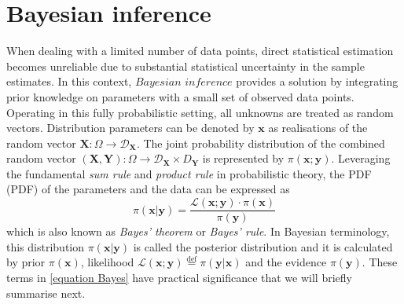 \label{ch:Bayesian}


\section{Bayesian inference}

When dealing with a limited number of data points, direct statistical estimation becomes unreliable due to substantial statistical uncertainty in the sample estimates. In this context, $\textit{Bayesian inference}$ provides a solution by integrating prior knowledge on parameters with a small set of observed data points. Operating in this fully probabilistic setting, all unknowns are treated as random vectors. Distribution parameters can be denoted by $\boldsymbol{x}$ as realisations of the random vector $\boldsymbol{X}:\Omega \rightarrow \mathcal{D}_{\boldsymbol{X}}$. The joint probability distribution of the combined random vector $(\boldsymbol{X},\boldsymbol{Y}):\Omega \rightarrow \mathcal{D}_{\boldsymbol{X}} \times {D}_{\boldsymbol{Y}}$ is represented by $\pi(\boldsymbol{x};\boldsymbol{y})$. Leveraging the fundamental \textit{sum rule} and \textit{product rule} in probabilistic theory, the \acrlong{PDF} (\acrshort{PDF}) of the parameters and the data can be expressed as
\begin{equation}
\pi(\boldsymbol{x}|\boldsymbol{y}) = \frac{{\mathcal{L}(\boldsymbol{x};\boldsymbol{y}) \cdot \pi(\boldsymbol{x})}}{{\pi(\boldsymbol{y})}} \label{equation Bayes}
\end{equation}
which is also known as \textit{Bayes' theorem} or \textit{Bayes' rule}. In Bayesian terminology, this distribution $\pi(\boldsymbol{x}|\boldsymbol{y})$ is called the posterior distribution and it is calculated by prior $\pi(\boldsymbol{x})$, likelihood $\mathcal{L}(\boldsymbol{x};\boldsymbol{y})\stackrel{\mathrm{def}}{=}\pi(\boldsymbol{y}|\boldsymbol{x})$
and the evidence $\pi(\boldsymbol{y})$. These terms in \cref{equation Bayes} have practical significance that we will briefly summarise next.
